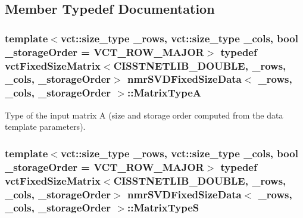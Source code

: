 \subsection{Member Typedef Documentation}
\hypertarget{classnmr_s_v_d_fixed_size_data_a86798e3079d3215e1ded8d48d914c45c}{
\subsubsection[{Matrix\-Type\-A}]{\setlength{\rightskip}{0pt plus 5cm}template$<$vct\-::size\-\_\-type \-\_\-rows, vct\-::size\-\_\-type \-\_\-cols, bool \-\_\-storage\-Order = V\-C\-T\-\_\-\-R\-O\-W\-\_\-\-M\-A\-J\-O\-R$>$ typedef {\bf vct\-Fixed\-Size\-Matrix}$<$C\-I\-S\-S\-T\-N\-E\-T\-L\-I\-B\-\_\-\-D\-O\-U\-B\-L\-E, \-\_\-rows, \-\_\-cols, \-\_\-storage\-Order$>$ {\bf nmr\-S\-V\-D\-Fixed\-Size\-Data}$<$ \-\_\-rows, \-\_\-cols, \-\_\-storage\-Order $>$\-::{\bf Matrix\-Type\-A}}}\label{classnmr_s_v_d_fixed_size_data_a86798e3079d3215e1ded8d48d914c45c}
Type of the input matrix A (size and storage order computed from the data template parameters). \hypertarget{classnmr_s_v_d_fixed_size_data_a4abee9caa16efd9bed6df1b4deec9207}{
\subsubsection[{Matrix\-Type\-S}]{\setlength{\rightskip}{0pt plus 5cm}template$<$vct\-::size\-\_\-type \-\_\-rows, vct\-::size\-\_\-type \-\_\-cols, bool \-\_\-storage\-Order = V\-C\-T\-\_\-\-R\-O\-W\-\_\-\-M\-A\-J\-O\-R$>$ typedef {\bf vct\-Fixed\-Size\-Matrix}$<$C\-I\-S\-S\-T\-N\-E\-T\-L\-I\-B\-\_\-\-D\-O\-U\-B\-L\-E, \-\_\-rows, \-\_\-cols, \-\_\-storage\-Order$>$ {\bf nmr\-S\-V\-D\-Fixed\-Size\-Data}$<$ \-\_\-rows, \-\_\-cols, \-\_\-storage\-Order $>$\-::{\bf Matrix\-Type\-S}}}\label{classnmr_s_v_d_fixed_size_data_a4abee9caa16efd9bed6df1b4deec9207}
